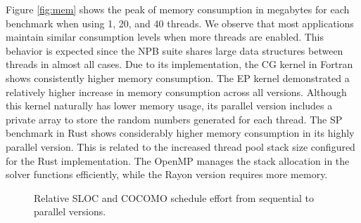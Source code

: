     Figure \ref{fig:mem} shows the peak of memory consumption in megabytes for each benchmark when using 1, 20, and 40 threads. We observe that most applications maintain similar consumption levels when more threads are enabled. This behavior is expected since the NPB suite shares large data structures between threads in almost all cases. Due to its implementation, the CG kernel in Fortran shows consistently higher memory consumption. The EP kernel demonstrated a relatively higher increase in memory consumption across all versions. Although this kernel naturally has lower memory usage, its parallel version includes a private array to store the random numbers generated for each thread. The SP benchmark in Rust shows considerably higher memory consumption in its highly parallel version. This is related to the increased thread pool stack size configured for the Rust implementation. The OpenMP manages the stack allocation in the solver functions efficiently, while the Rayon version requires more memory.


       \begin{figure*}[t]
         \centering
         \caption{Relative SLOC and COCOMO schedule effort from sequential to parallel versions.}
         \label{fig:sloocomo}
         \vspace{-0.3cm}
        \end{figure*}
        

